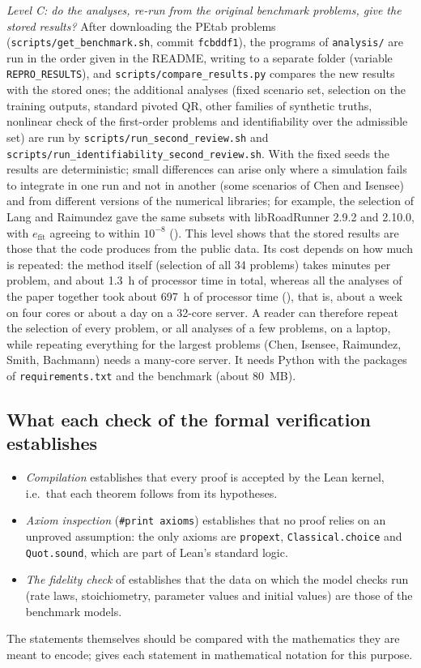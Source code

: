 \emph{Level C: do the analyses, re-run from the original benchmark problems, give the stored results?} After downloading the PEtab problems (\texttt{scripts/get\_benchmark.sh}, commit \texttt{fcbddf1}), the programs of \texttt{analysis/} are run in the order given in the README, writing to a separate folder (variable \texttt{REPRO\_RESULTS}), and \texttt{scripts/compare\_results.py} compares the new results with the stored ones; the additional analyses (fixed scenario set, selection on the training outputs, standard pivoted QR, other families of synthetic truths, nonlinear check of the first-order problems and identifiability over the admissible set) are run by \texttt{scripts/run\_second\_review.sh} and \texttt{scripts/run\_identifiability\_second\_review.sh}. With the fixed seeds the results are deterministic; small differences can arise only where a simulation fails to integrate in one run and not in another (some scenarios of Chen and Isensee) and from different versions of the numerical libraries; for example, the selection of Lang and Raimundez gave the same subsets with libRoadRunner 2.9.2 and 2.10.0, with $e_{\mathrm{fit}}$ agreeing to within $10^{-8}$ (). This level shows that the stored results are those that the code produces from the public data. Its cost depends on how much is repeated: the method itself (selection of all 34 problems) takes minutes per problem, and about 1.3~h of processor time in total, whereas all the analyses of the paper together took about 697~h of processor time (), that is, about a week on four cores or about a day on a 32-core server. A reader can therefore repeat the selection of every problem, or all analyses of a few problems, on a laptop, while repeating everything for the largest problems (Chen, Isensee, Raimundez, Smith, Bachmann) needs a many-core server. It needs Python with the packages of \texttt{requirements.txt} and the benchmark (about 80~MB).

\subsection*{What each check of the formal verification establishes}
\begin{itemize}\itemsep0pt
\item \emph{Compilation} establishes that every proof is accepted by the Lean kernel, i.e.\ that each theorem follows from its hypotheses.
\item \emph{Axiom inspection} (\texttt{\#print axioms}) establishes that no proof relies on an unproved assumption: the only axioms are \texttt{propext}, \texttt{Classical.choice} and \texttt{Quot.sound}, which are part of Lean's standard logic.
\item \emph{The fidelity check} of  establishes that the data on which the model checks run (rate laws, stoichiometry, parameter values and initial values) are those of the benchmark models.
\end{itemize}
The statements themselves should be compared with the mathematics they are meant to encode;  gives each statement in mathematical notation for this purpose.

